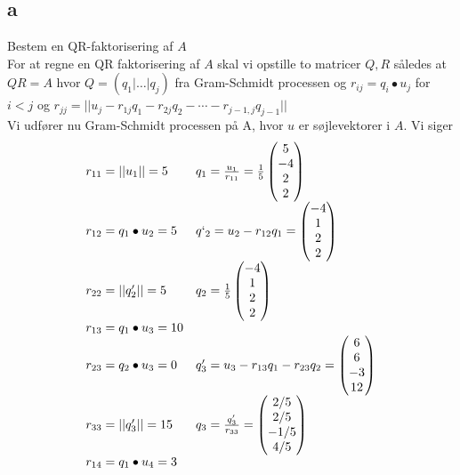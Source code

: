 \documentclass[a4paper,fleqn]{article}
\begin{document}
	\subsection{a}
	Bestem en QR-faktorisering af $A$\\
	For at regne en QR faktorisering af $A$ skal vi opstille to matricer $Q,R$ således at
	$QR = A$ hvor $Q = (q_1|\dots|q_j)$ fra Gram-Schmidt processen og $r_{ij} = q_i \bullet
	u_j$ for $i < j$ og $r_{jj} = ||u_j - r_{1j}q_1 - r_{2j}q_2-\cdots-r_{j-1,j}q_{j-1}||$\\
	Vi udfører nu Gram-Schmidt processen på A, hvor $u$ er søjlevektorer i $A$. Vi siger
	\begin{equation}
		\begin{array}{ll}
r_{11} = ||u_1|| = 5 & q_1 = \frac{u_1}{r_{11}} = \frac{1}{5} \begin{pmatrix} 5\\-4\\2\\2\end{pmatrix}\\
r_{12} = q_1 \bullet u_2 = 5 & q`_2 = u_2 - r_{12}q_1 = \begin{pmatrix}-4\\1\\2\\2\end{pmatrix}\\
r_{22} = ||q'_2|| = 5 & q_2 = \frac{1}{5}\begin{pmatrix}-4\\1\\2\\2\end{pmatrix}\\
r_{13} = q_1 \bullet u_3 = 10 & \\
r_{23} = q_2 \bullet u_3 = 0 & q'_3 = u_3 - r_{13}q_1 - r_{23}q_2 = \begin{pmatrix}6\\6\\-3\\12\end{pmatrix}\\
r_{33} = ||q'_3|| = 15 & q_3 = \frac{q'_3}{r_{33}} = \begin{pmatrix}2/5\\2/5\\-1/5\\4/5\end{pmatrix}\\
r_{14} = q_1 \bullet u_4 = 3 & \\

\end{array}
\end{equation}
\end{document}
